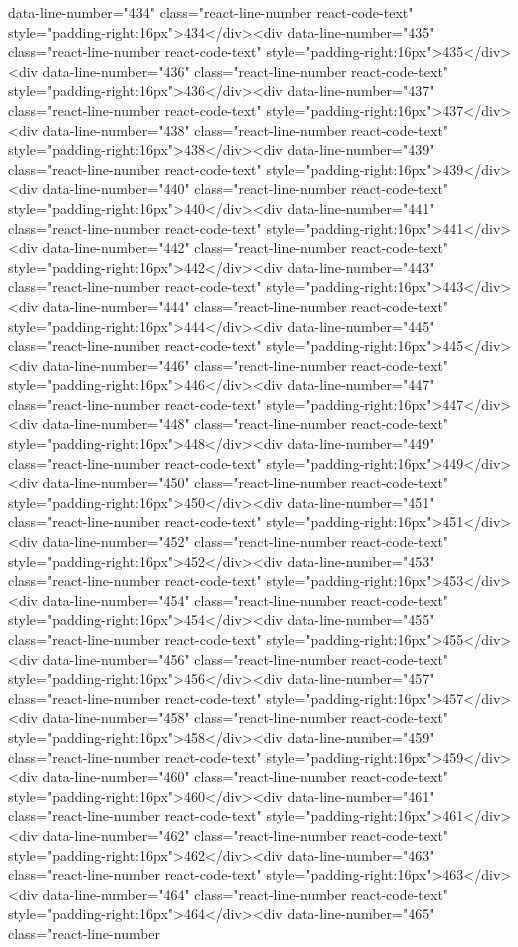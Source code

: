 data-line-number="434" class="react-line-number react-code-text" style="padding-right:16px">434</div><div data-line-number="435" class="react-line-number react-code-text" style="padding-right:16px">435</div><div data-line-number="436" class="react-line-number react-code-text" style="padding-right:16px">436</div><div data-line-number="437" class="react-line-number react-code-text" style="padding-right:16px">437</div><div data-line-number="438" class="react-line-number react-code-text" style="padding-right:16px">438</div><div data-line-number="439" class="react-line-number react-code-text" style="padding-right:16px">439</div><div data-line-number="440" class="react-line-number react-code-text" style="padding-right:16px">440</div><div data-line-number="441" class="react-line-number react-code-text" style="padding-right:16px">441</div><div data-line-number="442" class="react-line-number react-code-text" style="padding-right:16px">442</div><div data-line-number="443" class="react-line-number react-code-text" style="padding-right:16px">443</div><div data-line-number="444" class="react-line-number react-code-text" style="padding-right:16px">444</div><div data-line-number="445" class="react-line-number react-code-text" style="padding-right:16px">445</div><div data-line-number="446" class="react-line-number react-code-text" style="padding-right:16px">446</div><div data-line-number="447" class="react-line-number react-code-text" style="padding-right:16px">447</div><div data-line-number="448" class="react-line-number react-code-text" style="padding-right:16px">448</div><div data-line-number="449" class="react-line-number react-code-text" style="padding-right:16px">449</div><div data-line-number="450" class="react-line-number react-code-text" style="padding-right:16px">450</div><div data-line-number="451" class="react-line-number react-code-text" style="padding-right:16px">451</div><div data-line-number="452" class="react-line-number react-code-text" style="padding-right:16px">452</div><div data-line-number="453" class="react-line-number react-code-text" style="padding-right:16px">453</div><div data-line-number="454" class="react-line-number react-code-text" style="padding-right:16px">454</div><div data-line-number="455" class="react-line-number react-code-text" style="padding-right:16px">455</div><div data-line-number="456" class="react-line-number react-code-text" style="padding-right:16px">456</div><div data-line-number="457" class="react-line-number react-code-text" style="padding-right:16px">457</div><div data-line-number="458" class="react-line-number react-code-text" style="padding-right:16px">458</div><div data-line-number="459" class="react-line-number react-code-text" style="padding-right:16px">459</div><div data-line-number="460" class="react-line-number react-code-text" style="padding-right:16px">460</div><div data-line-number="461" class="react-line-number react-code-text" style="padding-right:16px">461</div><div data-line-number="462" class="react-line-number react-code-text" style="padding-right:16px">462</div><div data-line-number="463" class="react-line-number react-code-text" style="padding-right:16px">463</div><div data-line-number="464" class="react-line-number react-code-text" style="padding-right:16px">464</div><div data-line-number="465" class="react-line-number 